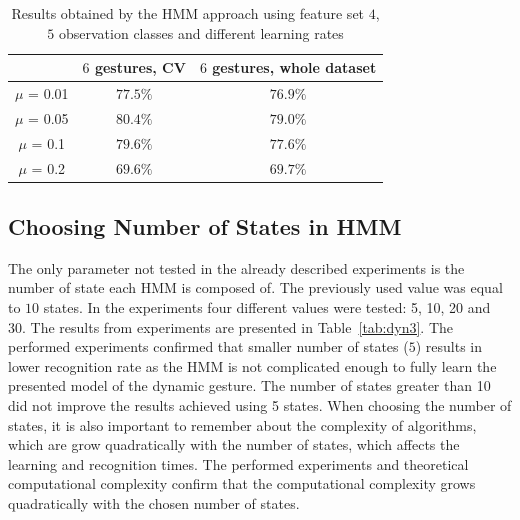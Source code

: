 \begin{table}[htbp!]
\begin{center}
	\label{tab:dyn2}
	\caption{Results obtained by the HMM approach using feature set $4$, $5$ observation classes and different learning rates}
    \begin{tabular}{ccc}
    \hline
    ~                                 & $6$ gestures, CV & $6$ gestures, whole dataset  \\ \hline
	$\mu$ = 0.01                  	  & $77.5\%$ & $76.9\%$   \\ \hline
    $\mu$ = 0.05                      & $80.4\%$ & $79.0\%$   \\ \hline
    $\mu$ = 0.1                      & $79.6\%$ & $77.6\%$   \\ \hline
    $\mu$ = 0.2                      & $69.6\%$ & $69.7\%$   \\ \hline
    \end{tabular}
\end{center}
\end{table}

\subsection{Choosing Number of States in HMM}

The only parameter not tested in the already described experiments is the number of state each HMM is composed of. 
The previously used value was equal to $10$ states. 
In the experiments four different values were tested: 5, 10, 20 and 30.
The results from experiments are presented in Table~\ref{tab:dyn3}. 
The performed experiments confirmed that smaller number of states ($5$) results in lower recognition rate as the HMM is not complicated enough to fully learn the presented model of the dynamic gesture.
The number of states greater than 10 did not improve the results achieved using 5 states.
When choosing the number of states, it is also important to remember about the complexity of algorithms, which are grow quadratically with the number of states, which affects the learning and recognition times. 
The performed experiments and theoretical computational complexity confirm that the computational complexity grows quadratically with the chosen number of states.


